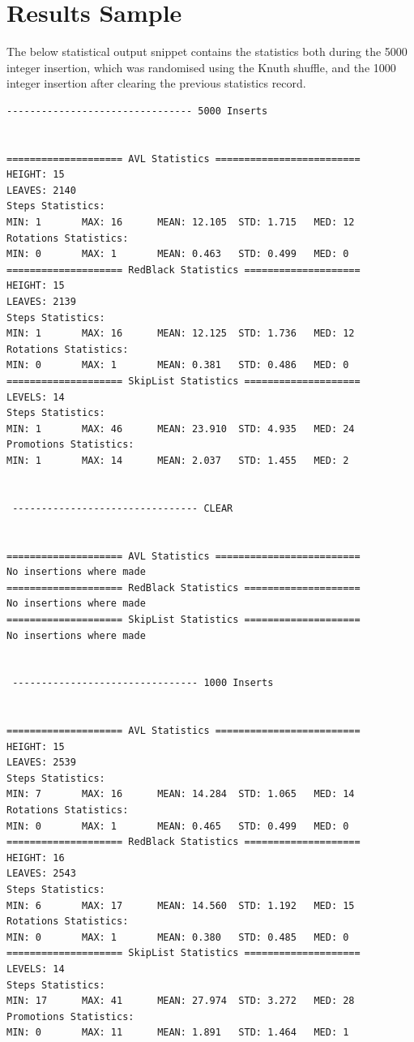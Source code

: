 \documentclass[12pt, a4paper]{report}
\begin{document}
\section{Results Sample}
The below statistical output snippet contains the statistics both during the 5000 integer insertion, which was randomised using the Knuth shuffle, and the 1000 integer insertion after clearing the previous statistics record.
\begin{verbatim}
-------------------------------- 5000 Inserts 


==================== AVL Statistics =========================
HEIGHT: 15
LEAVES: 2140
Steps Statistics:
MIN: 1       MAX: 16      MEAN: 12.105  STD: 1.715   MED: 12      
Rotations Statistics:
MIN: 0       MAX: 1       MEAN: 0.463   STD: 0.499   MED: 0       
==================== RedBlack Statistics ====================
HEIGHT: 15
LEAVES: 2139
Steps Statistics:
MIN: 1       MAX: 16      MEAN: 12.125  STD: 1.736   MED: 12      
Rotations Statistics:
MIN: 0       MAX: 1       MEAN: 0.381   STD: 0.486   MED: 0       
==================== SkipList Statistics ====================
LEVELS: 14
Steps Statistics:
MIN: 1       MAX: 46      MEAN: 23.910  STD: 4.935   MED: 24      
Promotions Statistics:
MIN: 1       MAX: 14      MEAN: 2.037   STD: 1.455   MED: 2       


 -------------------------------- CLEAR 


==================== AVL Statistics =========================
No insertions where made
==================== RedBlack Statistics ====================
No insertions where made
==================== SkipList Statistics ====================
No insertions where made


 -------------------------------- 1000 Inserts 


==================== AVL Statistics =========================
HEIGHT: 15
LEAVES: 2539
Steps Statistics:
MIN: 7       MAX: 16      MEAN: 14.284  STD: 1.065   MED: 14      
Rotations Statistics:
MIN: 0       MAX: 1       MEAN: 0.465   STD: 0.499   MED: 0       
==================== RedBlack Statistics ====================
HEIGHT: 16
LEAVES: 2543
Steps Statistics:
MIN: 6       MAX: 17      MEAN: 14.560  STD: 1.192   MED: 15      
Rotations Statistics:
MIN: 0       MAX: 1       MEAN: 0.380   STD: 0.485   MED: 0       
==================== SkipList Statistics ====================
LEVELS: 14
Steps Statistics:
MIN: 17      MAX: 41      MEAN: 27.974  STD: 3.272   MED: 28      
Promotions Statistics:
MIN: 0       MAX: 11      MEAN: 1.891   STD: 1.464   MED: 1       
\end{verbatim}
\end{document}
